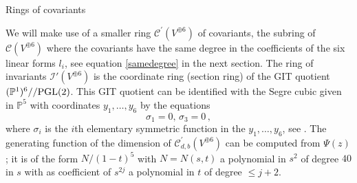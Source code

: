 \documentclass[12pt]{amsart}
\numberwithin{equation}{section}
\newcommand{\PP}{\mathbb P}
\def\leq{\leqslant}
\numberwithin{equation}{section}
\theoremstyle{definition}
\theoremstyle{remark}
\begin{document}
\begin{section}{Rings of covariants}
\bigskip

We will make use of a smaller ring
$\mathcal{C}^{\prime}(V^{\oplus 6})$  of covariants, the subring of 
$\mathcal{C}(V^{\oplus 6})$  where the covariants have
the same degree in the coefficients of the six linear forms $l_i$, see equation
\ref{samedegree} in the next section. 
The ring of invariants $\mathcal{I}'(V^{\oplus 6})$
is the coordinate ring (section ring) of the
 GIT quotient $({\PP}^1)^6//{\rm PGL}(2)$. This GIT quotient
 can be identified with the Segre cubic
given in ${\PP}^5$ with coordinates $y_1,\ldots,y_6$ by 
the equations
\begin{equation}\label{Segre}
\sigma_1=0, \, \sigma_3=0\, , 
\end{equation}
where $\sigma_i$ is the $i$th elementary symmetric function in the $y_1,\ldots,y_6$,
see \cite{D-O}.
The generating function of the dimension of $\mathcal{C}^{\prime}_{d,b}(V^{\oplus 6})$ 
can be computed from $\Psi(z)$; it is of the form $N/(1-t)^5$ with $N=N(s,t)$ a polynomial in $s^2$ of
degree $40$ in $s$ with as coefficient of $s^{2j}$ a polynomial in $t$ of degree $\leq j+2$.
\end{section}
\end{document}
